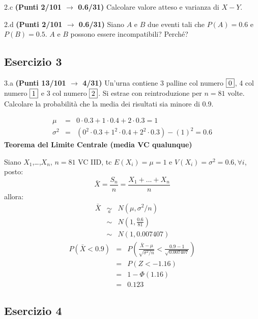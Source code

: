 \documentclass[
  11pt,
]{book}
\theoremstyle{mytheoremstyle}
\theoremstyle{mydefstyle}
\newenvironment{sol}
  {
  \begin{tcolorbox}[enhanced,breakable,arc=0.1mm,boxrule=1pt,colback=white,colframe=iblue,
  title=\bf \fontfamily{lmss}\selectfont \hspace{.5 cm} Soluzione,drop fuzzy shadow]

}{
\end{tcolorbox}
  }
\begin{document}
2.c \textbf{(Punti 2/101 \(\rightarrow\) 0.6/31)} Calcolare valore atteso e varianza di \(X-Y\).

2.d \textbf{(Punti 2/101 \(\rightarrow\) 0.6/31)} Siano \(A\) e \(B\) due eventi tali che \(P(A)=0.6\) e \(P(B)=0.5\). \(A\) e \(B\) possono essere incompatibili? Perché?

\subsection{Esercizio 3}\label{esercizio-3-26}

3.a \textbf{(Punti 13/101 \(\rightarrow\) 4/31)} Un'urna contiene 3 palline col numero \(\fbox{0}\), 4 col numero \(\fbox{1}\) e 3 col numero \(\fbox{2}\). Si estrae con reintroduzione per \(n=81\) volte.
Calcolare la probabilità che la media dei risultati sia minore di 0.9.

\begin{sol}
\begin{eqnarray*}
 \mu &=&  0  \cdot 0.3+ 1  \cdot 0.4+ 2  \cdot 0.3 = 1 \\ \sigma^2 &=&(  0 ^2 \cdot 0.3+ 1 ^2 \cdot 0.4+ 2 ^2 \cdot 0.3 )-( 1 )^2= 0.6 \end{eqnarray*}\textbf{Teorema del Limite Centrale (media VC qualunque)}

Siano \(X_1\),\ldots,\(X_n\), \(n=81\) VC IID, tc \(E(X_i)=\mu=1\) e \(V(X_i)=\sigma^2=0.6,\forall i\), posto:
\[
      \bar X=\frac{S_n}n =\frac{X_1 + ... + X_n}n
      \]
allora:\begin{eqnarray*}
  \bar X & \mathop{\sim}\limits_{a}& N(\mu,\sigma^2/n) \\
     &\sim & N\left(1,\frac{0.6}{81}\right) \\
     &\sim & N(1,0.007407)
  \end{eqnarray*}\begin{eqnarray*}
      P( \bar X   <   0.9 ) 
        &=& P\left(  \frac { \bar X  -  \mu }{ \sqrt{\sigma^2/n} }  <  \frac { 0.9  -  1 }{\sqrt{ 0.007407 }} \right)  \\
                 &=& P\left(  Z   <   -1.16 \right) \\    
                 &=&  1-\Phi( 1.16 ) \\ &=&  0.123 
      \end{eqnarray*}

\end{sol}

\subsection{Esercizio 4}\label{esercizio-4-26}
\end{document}
